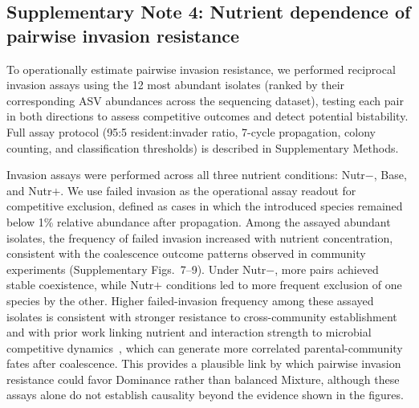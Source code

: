 \subsection*{Supplementary Note 4: Nutrient dependence of pairwise invasion resistance}
\label{sec:suppl:note4}

To operationally estimate pairwise invasion resistance, we performed reciprocal invasion assays using the 12 most abundant isolates (ranked by their corresponding ASV abundances across the sequencing dataset), testing each pair in both directions to assess competitive outcomes and detect potential bistability. Full assay protocol (95:5 resident:invader ratio, 7-cycle propagation, colony counting, and classification thresholds) is described in Supplementary Methods.

Invasion assays were performed across all three nutrient conditions: Nutr$-$, Base, and Nutr$+$. We use failed invasion as the operational assay readout for competitive exclusion, defined as cases in which the introduced species remained below 1\% relative abundance after propagation. Among the assayed abundant isolates, the frequency of failed invasion increased with nutrient concentration, consistent with the coalescence outcome patterns observed in community experiments (Supplementary Figs.~7--9). Under Nutr$-$, more pairs achieved stable coexistence, while Nutr$+$ conditions led to more frequent exclusion of one species by the other. Higher failed-invasion frequency among these assayed isolates is consistent with stronger resistance to cross-community establishment~\citep{Hu2025,Kurkjian2021} and with prior work linking nutrient and interaction strength to microbial competitive dynamics~\citep{Hu2022,Ratzke2020}, which can generate more correlated parental-community fates after coalescence. This provides a plausible link by which pairwise invasion resistance could favor Dominance rather than balanced Mixture, although these assays alone do not establish causality beyond the evidence shown in the figures.
